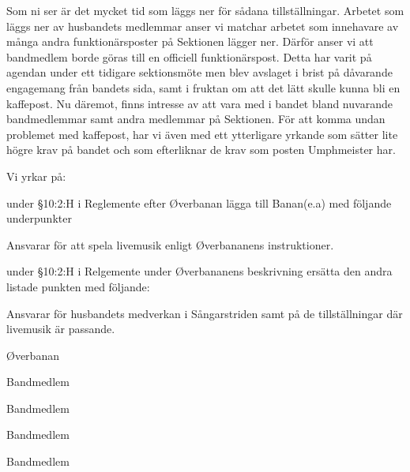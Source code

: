 \documentclass[../_main/handlingar.tex]{subfiles}
\begin{document}
Som ni ser är det mycket tid som läggs ner för sådana tillställningar. Arbetet som läggs ner av husbandets medlemmar anser vi matchar arbetet som innehavare av många andra funktionärsposter på Sektionen lägger ner. Därför anser vi att bandmedlem borde göras till en officiell funktionärspost. 
Detta har varit på agendan under ett tidigare sektionsmöte men blev avslaget i brist på dåvarande engagemang från bandets sida, samt i fruktan om att det lätt skulle kunna bli en kaffepost. Nu däremot, finns intresse av att vara med i bandet bland nuvarande bandmedlemmar samt andra medlemmar på Sektionen. För att komma undan problemet med kaffepost, har vi även med ett ytterligare yrkande som sätter lite högre krav på bandet och som efterliknar de krav som posten Umphmeister har.

Vi yrkar på:
\begin{attsatser}
    \att under \S10:2:H i Reglemente efter Øverbanan lägga till Banan(e.a) med följande underpunkter
    \begin{itemizedash}
            \item Ansvarar för att spela livemusik enligt Øverbananens instruktioner.
    \end{itemizedash}  
    \att under \S10:2:H i Relgemente under Øverbananens beskrivning ersätta den andra listade punkten med följande:
    \begin{itemizedash}
            \item Ansvarar för husbandets medverkan i Sångarstriden samt på de tillställningar där livemusik är passande.
    \end{itemizedash}
\end{attsatser}

\begin{signatures}{5}
	\mvh
	\signature{William Sjödin}{Øverbanan}
	\signature{Daniel Bakic}{Bandmedlem}
    \signature{Oskar Magnusson}{Bandmedlem}
    \signature{Valter Möller}{Bandmedlem}
    \signature{Lukas Elmlund}{Bandmedlem}
\end{signatures}
\end{document}
